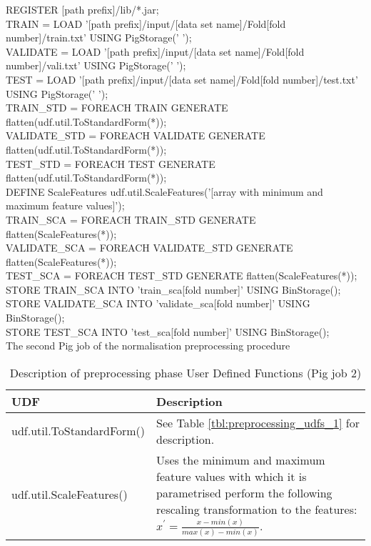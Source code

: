 \begin{algorithm}
REGISTER [path prefix]/lib/*.jar;\\
TRAIN = LOAD '[path prefix]/input/[data set name]/Fold[fold number]/train.txt' USING PigStorage(' ');\\
VALIDATE = LOAD '[path prefix]/input/[data set name]/Fold[fold number]/vali.txt' USING PigStorage(' ');\\
TEST = LOAD '[path prefix]/input/[data set name]/Fold[fold number]/test.txt' USING PigStorage(' ');\\
TRAIN\_STD = FOREACH TRAIN GENERATE flatten(udf.util.ToStandardForm(*));\\
VALIDATE\_STD = FOREACH VALIDATE GENERATE flatten(udf.util.ToStandardForm(*));\\
TEST\_STD = FOREACH TEST GENERATE flatten(udf.util.ToStandardForm(*));\\
DEFINE ScaleFeatures udf.util.ScaleFeatures('[array with minimum and maximum feature values]');\\
TRAIN\_SCA = FOREACH TRAIN\_STD GENERATE flatten(ScaleFeatures(*));\\
VALIDATE\_SCA = FOREACH VALIDATE\_STD GENERATE flatten(ScaleFeatures(*));\\
TEST\_SCA = FOREACH TEST\_STD GENERATE flatten(ScaleFeatures(*));\\
STORE TRAIN\_SCA INTO 'train\_sca[fold number]' USING BinStorage();\\
STORE VALIDATE\_SCA INTO 'validate\_sca[fold number]' USING BinStorage();\\
STORE TEST\_SCA INTO 'test\_sca[fold number]' USING BinStorage();\\
\caption{The second Pig job of the normalisation preprocessing procedure}
\label{alg:pig_normalisation_2}
\end{algorithm}

\begin{table}
\centering
\begin{tabular}{p{5cm}p{8cm}}\toprule
UDF & Description \\
\midrule
udf.util.ToStandardForm() & See Table \ref{tbl:preprocessing_udfs_1} for description.\\
udf.util.ScaleFeatures() & Uses the minimum and maximum feature values with which it is parametrised perform the following rescaling transformation to the features: $x^{'} = \frac{x-min(x)}{max(x)-min(x)}$.\\
\bottomrule
\end{tabular}
\caption{Description of preprocessing phase User Defined Functions (Pig job 2)}
\label{tbl:preprocessing_udfs_2}
\end{table}

